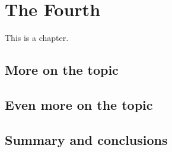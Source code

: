 
\chapter{The Fourth}

This is a chapter.

\blah

\blah

\blah

\section{More on the topic}

\blah

\blah

\section{Even more on the topic}

\blah

\blah

\section{Summary and conclusions}

\blah
